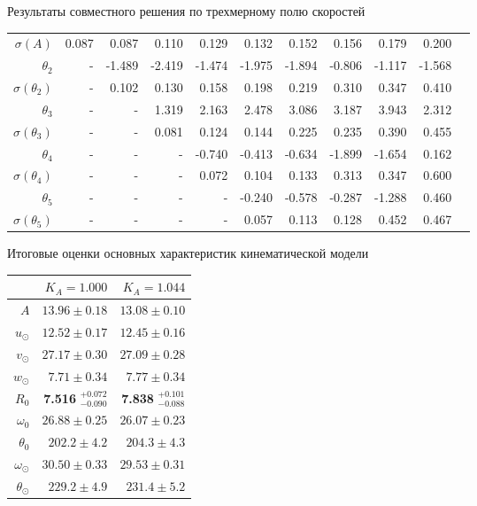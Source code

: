 \documentclass[compress]{beamer}
\begin{document}
\begin{frame}{Результаты совместного решения по трехмерному полю скоростей}
\begin{table}[h!!]
\begin{tabular}{r|rr|r|r|r|rrrrr}
 $\sigma(A) $ & 0.087       &    0.087 &    0.110 &   0.129 &   0.132 &   0.152 &    0.156 &   0.179 &     0.200 \\
 $\theta_2$&-        &  -1.489 &  -2.419 &  -1.474 &  -1.975 &  -1.894 &   -0.806 &  -1.117 &  -1.568 \\
 $\sigma(\theta_2)$&-      &     0.102 &    0.130 &   0.158 &   0.198 &   0.219 &     0.310 &   0.347 &    0.410 \\
 $\theta_3$&-      &    - &   1.319 &   2.163 &   2.478 &   3.086 &    3.187 &   3.943 &   2.312 \\
 $\sigma(\theta_3)$&-      &    - &   0.081 &   0.124 &   0.144 &   0.225 &    0.235 &   0.390 &   0.455 \\
 $\theta_4$&-      &    - &    - &  -0.740 &  -0.413 &  -0.634 &   -1.899 &  -1.654 &   0.162 \\
 $\sigma(\theta_4)$&-      &    - &    - &     0.072 &   0.104 &   0.133 &    0.313 &   0.347 &   0.600 \\
 $\theta_5$&-      &    - &    - &    - &  -0.240 &  -0.578 &   -0.287 &  -1.288 &   0.460 \\
 $\sigma(\theta_5)$&-      &    - &    - &    - &     0.057 &   0.113 &    0.128 &   0.452 &   0.467 \\

 \end{tabular}
\end{table}
\end{frame}

\begin{frame}{Итоговые оценки основных характеристик кинематической модели}
\begin{table}[h!!] 
\centering
\begin{tabular}{r||r|r}
       &  $K_A = 1.000$ & $K_A = 1.044$\\
\hline
\hline
$A $&  $ 13.96 \pm 0.18 $& $13.08 \pm 0.10$ \\ 
$u_{\odot} $ & $12.52 \pm 0.17  $& $ 12.45 \pm 0.16$\\
$v_{\odot} $  & $27.17  \pm 0.30 $& $27.09 \pm 0.28$\\
$w_{\odot} $ & $7.71 \pm 0.34$ & $7.77 \pm 0.34$\\
\hline
$R_0  $ & \textbf{7.516} $^{+0.072}_{-0.090} $   & \textbf{7.838} $^{+0.101}_{-0.088}$ \\
$\omega_0 $ & $26.88 \pm 0.25 $ & $26.07 \pm 0.23$\\
$\theta_0 $& $202.2 \pm 4.2 $ & $ 204.3 \pm 4.3$ \\
\hline
$\omega_{\odot} $& $30.50 \pm 0.33 $ & $29.53 \pm 0.31$ \\
$\theta_{\odot} $& $229.2 \pm 4.9 $ & $231.4 \pm 5.2$ \\
\end{tabular}
\end{table}

\end{frame}
\end{document}
